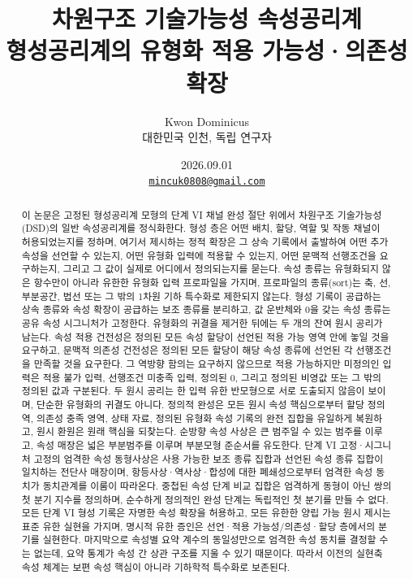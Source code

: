 \documentclass[11pt]{article}
\title{차원구조 기술가능성 속성공리계\\[0.35em]
\large 형성공리계의 유형화 적용 가능성·의존성 확장}
\author{Kwon Dominicus\\\small 대한민국 인천, 독립 연구자}
\date{2026.09.01\\[0.4em]\small\href{mailto:mincuk0808@gmail.com}{\texttt{mincuk0808@gmail.com}}}
\theoremstyle{definition}
\theoremstyle{remark}
\begin{document}
\maketitle

\begin{abstract}
이 논문은 고정된 형성공리계 모형의 단계 VI 채널 완성 절단 위에서 차원구조 기술가능성(DSD)의 일반 속성공리계를 정식화한다.
형성 층은 어떤 배치, 할당, 역할 및 작동 채널이 허용되었는지를 정하며, 여기서 제시하는 정적 확장은 그 상속 기록에서 출발하여 어떤 추가 속성을 선언할 수 있는지, 어떤 유형화 입력에 적용할 수 있는지, 어떤 문맥적 선행조건을 요구하는지, 그리고 그 값이 실제로 어디에서 정의되는지를 묻는다.
속성 종류는 유형화되지 않은 항수만이 아니라 유한한 유형화 입력 프로파일을 가지며, 프로파일의 종류(sort)는 축, 선, 부분공간, 법선 또는 그 밖의 1차원 기하 특수화로 제한되지 않는다.
형성 기록이 공급하는 상속 종류와 속성 확장이 공급하는 보조 종류를 분리하고, 값 운반체와 0을 갖는 속성 종류는 공유 속성 시그니처가 고정한다.
유형화의 귀결을 제거한 뒤에는 두 개의 잔여 원시 공리가 남는다.
속성 적용 건전성은 정의된 모든 속성 할당이 선언된 적용 가능 영역 안에 놓일 것을 요구하고, 문맥적 의존성 건전성은 정의된 모든 할당이 해당 속성 종류에 선언된 각 선행조건을 만족할 것을 요구한다.
그 역방향 함의는 요구하지 않으므로 적용 가능하지만 미정의인 입력은 적용 불가 입력, 선행조건 미충족 입력, 정의된 0, 그리고 정의된 비영값 또는 그 밖의 정의된 값과 구분된다.
두 원시 공리는 한 입력 유한 반모형으로 서로 도출되지 않음이 보이며, 단순한 유형화의 귀결도 아니다.
정의적 완성은 모든 원시 속성 핵심으로부터 할당 정의역, 의존성 충족 영역, 상태 자료, 정의된 유형화 속성 기록의 완전 집합을 유일하게 복원하고, 원시 환원은 원래 핵심을 되찾는다.
순방향 속성 사상은 큰 범주일 수 있는 범주를 이루고, 속성 매장은 넓은 부분범주를 이루며 부분모형 준순서를 유도한다. 단계 VI 고정·시그니처 고정의 엄격한 속성 동형사상은 사용 가능한 보조 종류 집합과 선언된 속성 종류 집합이 일치하는 전단사 매장이며, 항등사상·역사상·합성에 대한 폐쇄성으로부터 엄격한 속성 동치가 동치관계를 이룸이 따라온다.
중첩된 속성 단계 비교 집합은 엄격하게 동형이 아닌 쌍의 첫 분기 지수를 정의하며, 순수하게 정의적인 완성 단계는 독립적인 첫 분기를 만들 수 없다.
모든 단계 VI 형성 기록은 자명한 속성 확장을 허용하고, 모든 유한한 양립 가능 원시 제시는 표준 유한 실현을 가지며, 명시적 유한 증인은 선언·적용 가능성/의존성·할당 층에서의 분기를 실현한다.
마지막으로 속성별 요약 계수의 동일성만으로 엄격한 속성 동치를 결정할 수는 없는데, 요약 통계가 속성 간 상관 구조를 지울 수 있기 때문이다.
따라서 이전의 실현축 속성 체계는 보편 속성 핵심이 아니라 기하학적 특수화로 보존된다.
\end{abstract}
\end{document}
